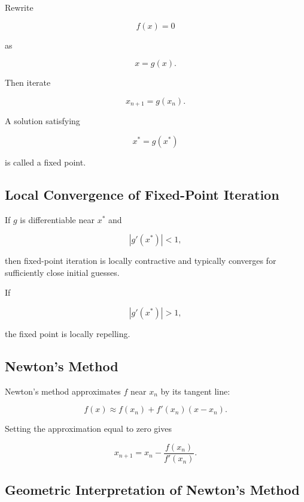Rewrite

\[
f(x)=0
\]

as

\[
\boxed{
x=g(x).
}
\]

Then iterate

\[
\boxed{
x_{n+1}
=
g(x_n).
}
\]

A solution satisfying

\[
x^*=g(x^*)
\]

is called a fixed point.

\subsection{Local Convergence of Fixed-Point Iteration}
\label{subsec:fixed-point-local-convergence}

If \(g\) is differentiable near \(x^*\) and

\[
\boxed{
|g'(x^*)|<1,
}
\]

then fixed-point iteration is locally contractive and typically converges
for sufficiently close initial guesses.

If

\[
|g'(x^*)|>1,
\]

the fixed point is locally repelling.

\subsection{Newton's Method}
\label{subsec:newtons-method}

Newton's method approximates \(f\) near \(x_n\) by its tangent line:

\[
f(x)
\approx
f(x_n)
+
f'(x_n)(x-x_n).
\]

Setting the approximation equal to zero gives

\[
\boxed{
x_{n+1}
=
x_n
-
\frac{
f(x_n)
}{
f'(x_n)
}.
}
\]

\subsection{Geometric Interpretation of Newton's Method}
\label{subsec:newton-geometric}

